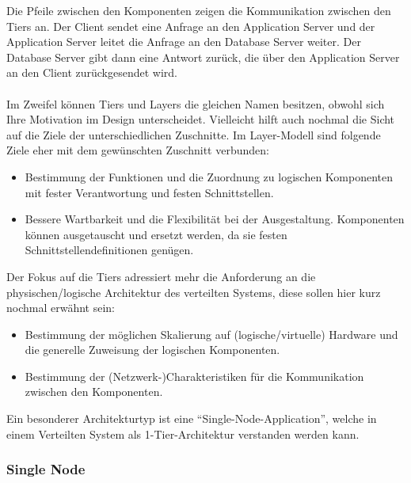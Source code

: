 \documentclass[../vs-script-first-v01.tex]{subfiles}
\begin{document}
Die Pfeile zwischen den Komponenten zeigen die Kommunikation zwischen den Tiers an. Der Client sendet eine Anfrage an den Application Server und der Application Server leitet die Anfrage an den Database Server weiter. Der Database Server gibt dann eine Antwort zurück, die über den Application Server an den Client zurückgesendet wird.
\\\\
Im Zweifel können Tiers und Layers die gleichen Namen besitzen, obwohl sich Ihre Motivation im Design unterscheidet. Vielleicht hilft auch nochmal die Sicht auf die Ziele der unterschiedlichen Zuschnitte. Im Layer-Modell sind folgende Ziele eher mit dem gewünschten Zuschnitt verbunden:
\begin{itemize}
\item Bestimmung der Funktionen und die Zuordnung zu logischen Komponenten mit fester Verantwortung und festen Schnittstellen. 
\item Bessere Wartbarkeit und die Flexibilität bei der Ausgestaltung. Komponenten können ausgetauscht und ersetzt werden, da sie festen Schnittstellendefinitionen genügen.  
\end{itemize}
Der Fokus auf die Tiers adressiert mehr die Anforderung an die physischen/logische Architektur des verteilten Systems, diese sollen hier kurz nochmal erwähnt sein:
\begin{itemize}
\item Bestimmung der möglichen Skalierung auf (logische/virtuelle) Hardware und die generelle Zuweisung der logischen Komponenten.
\item Bestimmung der (Netzwerk-)Charakteristiken für die Kommunikation zwischen den Komponenten.
\end{itemize}
Ein besonderer Architekturtyp ist eine \enquote{Single-Node-Application}, welche in einem Verteilten System als 1-Tier-Architektur verstanden werden kann.

\subsubsection{Single Node}
\end{document}
